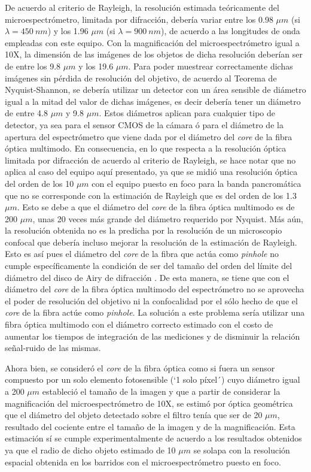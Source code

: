 De acuerdo al criterio de Rayleigh, la resolución estimada teóricamente del microespectrómetro, limitada por difracción, debería variar entre los 0.98 $\mu m$ (si $\lambda = 450 ~nm$) y los 1.96 $\mu m$ (si $\lambda = 900 ~nm$), de acuerdo a las longitudes de onda empleadas con este equipo. Con la magnificación del microespectrómetro igual a 10X, la dimensión de las imágenes de los objetos de dicha resolución deberían ser de entre los 9.8 $\mu m$ y los 19.6 $\mu m$. Para poder muestrear correctamente dichas imágenes sin pérdida de resolución del objetivo, de acuerdo al Teorema de Nyquist-Shannon, se debería utilizar un detector con un área sensible de diámetro igual a la mitad del valor de dichas imágenes, es decir debería tener un diámetro de entre 4.8 $\mu m$ y 9.8 $\mu m$. Estos diámetros aplican para cualquier tipo de detector, ya sea para el sensor CMOS de la cámara ó para el diámetro de la apertura del espectrómetro que viene dada por el diámetro del \textit{core} de la fibra óptica multimodo. En consecuencia, en lo que respecta a la resolución óptica limitada por difracción de acuerdo al criterio de Rayleigh, se hace notar que no aplica al caso del equipo aquí presentado, ya que se midió una resolución óptica del orden de los 10 $\mu m$ con el equipo puesto en foco para la banda pancromática que no se corresponde con la estimación de Rayleigh que es del orden de los 1.3 $\mu m$. Esto se debe a que el diámetro del \textit{core} de la fibra óptica multimodo es de 200 $\mu m$, unas 20 veces más grande del diámetro requerido por Nyquist. Más aún, la resolución obtenida no es la predicha por la resolución de un microscopio confocal que debería incluso mejorar la resolución de la estimación de Rayleigh. Esto es así pues el diámetro del \textit{core} de la fibra que actúa como \textit{pinhole} no cumple específicamente la condición de ser del tamaño del orden del límite del diámetro del disco de Airy de difracción \cite{wilson}. De esta manera, se tiene que con el diámetro del \textit{core} de la fibra óptica multimodo del espectrómetro no se aprovecha el poder de resolución del objetivo ni la confocalidad por el sólo hecho de que el \textit{core} de la fibra actúe como \textit{pinhole}. La solución a este problema sería utilizar una fibra óptica multimodo con el diámetro correcto estimado con el costo de aumentar los tiempos de integración de las mediciones y de disminuir la relación señal-ruido de las mismas.

Ahora bien, se consideró el \textit{core} de la fibra óptica como si fuera un sensor compuesto por un solo elemento fotosensible (`1 solo píxel´) cuyo diámetro igual a 200 $\mu m$ estableció el tamaño de la imagen y que a partir de considerar la magnificación del microespectrómetro de 10X, se estimó por óptica geométrica que el diámetro del objeto detectado sobre el filtro tenía que ser de 20 $\mu m$, resultado del cociente entre el tamaño de la imagen y de la magnificación. Esta estimación sí se cumple experimentalmente de acuerdo a los resultados obtenidos ya que el radio de dicho objeto estimado de 10 $\mu m$ se solapa con la resolución espacial obtenida en los barridos con el microespectrómetro puesto en foco.

